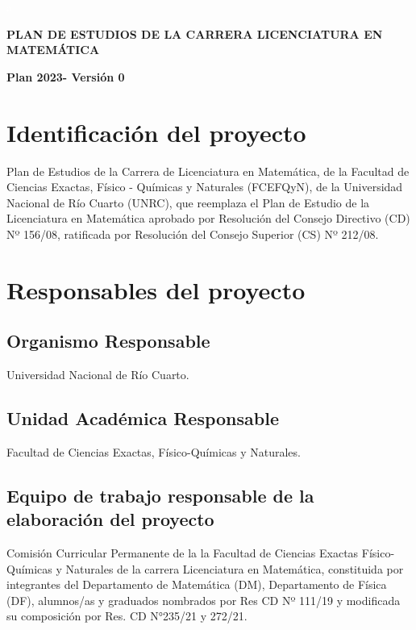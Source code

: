 \documentclass[a4paper, 12pt]{article}
\begin{document}
 
 
 \textcolor{white}{a}   
 \vspace{3cm}
 
\begin{center}
 \textbf{PLAN DE ESTUDIOS DE LA CARRERA LICENCIATURA EN MATEMÁTICA}
 
\textbf{Plan 2023- Versión 0}
\end{center}


 
 \newpage



\tableofcontents

\newpage


\section{Identificación del proyecto}  

Plan de Estudios de la 
Carrera de Licenciatura en Matemática, de la Facultad de Ciencias Exactas, 
Físico - Químicas y Naturales (FCEFQyN), de la Universidad Nacional de Río Cuarto (UNRC), que  reemplaza el Plan de Estudio de la Licenciatura en Matemática aprobado por Resolución del Consejo Directivo (CD) Nº 156/08, 
ratificada por Resolución del Consejo Superior (CS) Nº 212/08.


\section{Responsables del proyecto}

\subsection{ Organismo Responsable} 

Universidad Nacional de Río Cuarto.

\subsection{Unidad Académica Responsable} 

Facultad de Ciencias Exactas, Físico-Químicas y Naturales.



\subsection{Equipo de trabajo responsable de la elaboración del proyecto}

Comisión Curricular Permanente de la 
la Facultad de Ciencias Exactas Físico-Químicas y Naturales de la carrera Licenciatura en Matemática, constituida por integrantes del Departamento de Matemática (DM), Departamento de Física (DF), alumnos/as y graduados nombrados por Res CD Nº  111/19 y modificada su composición por Res. CD N°235/21 y 272/21.  
\end{document}
